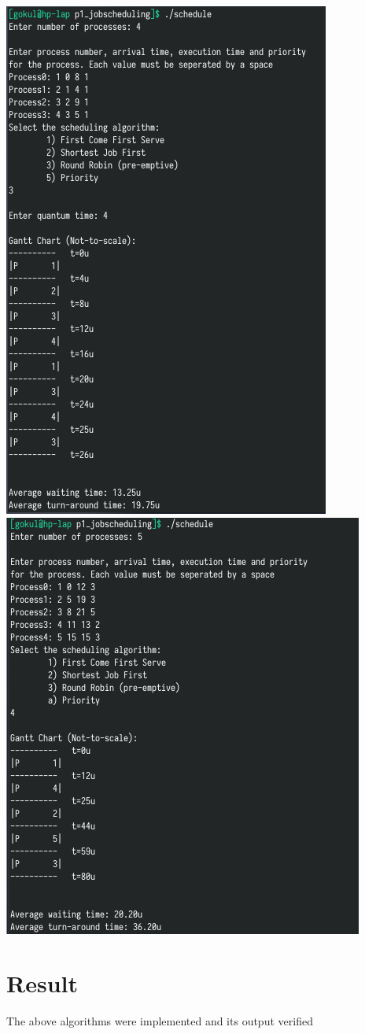 \documentclass[13pt,oneside]{book}
\begin{document}
\includegraphics[]{img/p1/ss3.png} \\
\includegraphics[]{img/p1/ss4.png}

\Large
\section*{Result}
\large
The above algorithms were implemented and its output verified
\end{document}
